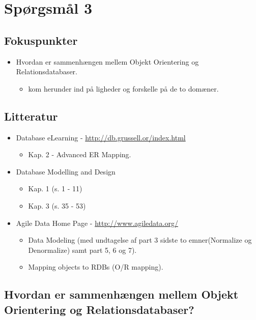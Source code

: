 \section{Spørgsmål 3}

\subsection{Fokuspunkter}
\begin{itemize}
	\item Hvordan er sammenhængen mellem Objekt Orientering og Relationsdatabaser.
	\begin{itemize}
		\item kom herunder ind på ligheder og forskelle på de to domæner.
	\end{itemize}
\end{itemize}

\subsection{Litteratur}
\begin{itemize}
	\item Database eLearning - \url{http://db.grussell.or/index.html}
	\begin{itemize}
		\item Kap. 2 - Advanced ER Mapping.
	\end{itemize}
	\item Database Modelling and Design
	\begin{itemize}
		\item Kap. 1 (s. 1 - 11)
		\item Kap. 3 (s. 35 - 53)
	\end{itemize}
	\item Agile Data Home Page - \url{http://www.agiledata.org/}
	\begin{itemize}
		\item Data Modeling (med undtagelse af part 3 sidste to emner(Normalize og Denormalize) samt part 5, 6 og 7).
		\item Mapping objects to RDBs (O/R mapping).
	\end{itemize}
\end{itemize}

\newpage

\subsection{Hvordan er sammenhængen mellem Objekt Orientering og Relationsdatabaser?}

